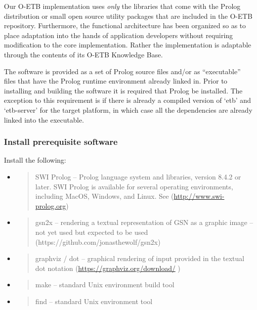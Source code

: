 \documentclass[12pt,twoside,a4paper]{article}
\begin{document}
Our O-ETB implementation uses \emph{only} the libraries that come with the Prolog distribution or small open source utility packages that are included in the O-ETB repository. Furthermore, the functional architecture has been organized so as to place adaptation into the hands of application developers without requiring modification to the core implementation. Rather the implementation is adaptable through the contents of its O-ETB Knowledge Base.

The software is provided as a set of Prolog source files and/or as ``executable'' files that have the Prolog runtime environment already linked in. Prior to installing and building the software it is required that Prolog be installed. The exception to this requirement is if there is already a compiled version of `etb' and `etb-server' for the target platform, in which case all the dependencies are already linked into the executable.

\hypertarget{install-prerequisite-software}{%
\subsubsection{\texorpdfstring{Install prerequisite software }{Install prerequisite software }}\label{install-prerequisite-software}}

Install the following:

\begin{itemize}
\item
  \begin{quote}
  SWI Prolog -- Prolog language system and libraries, version 8.4.2 or later. SWI Prolog is available for several operating environments, including MacOS, Windows, and Linux. See (\url{http://www.swi-prolog.org})
  \end{quote}
\item
  \begin{quote}
  gsn2x -- rendering a textual representation of GSN as a graphic image -- not yet used but expected to be used (https://github.com/jonasthewolf/gsn2x)
  \end{quote}
\item
  \begin{quote}
  graphviz / dot -- graphical rendering of input provided in the textual dot notation (\url{https://graphviz.org/download/} )
  \end{quote}
\item
  \begin{quote}
  make -- standard Unix environment build tool
  \end{quote}
\item
  \begin{quote}
  find -- standard Unix environment tool
  \end{quote}
\end{itemize}
\end{document}
